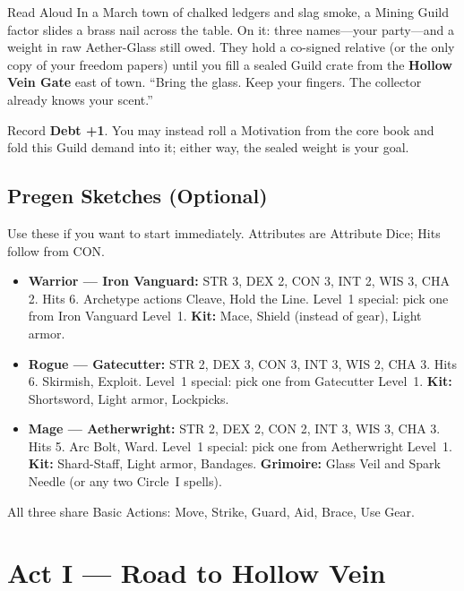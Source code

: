 \begin{rpgbox}{Read Aloud}
    In a March town of chalked ledgers and slag smoke, a Mining Guild factor slides a brass nail across the table.
    On it: three names---your party---and a weight in raw Aether-Glass still owed.
    They hold a co-signed relative (or the only copy of your freedom papers) until you fill a sealed Guild crate from the \textbf{Hollow Vein Gate} east of town.
    ``Bring the glass. Keep your fingers. The collector already knows your scent.''
\end{rpgbox}

Record \textbf{Debt +1}. You may instead roll a Motivation from the core book and fold this Guild demand into it; either way, the sealed weight is your goal.

\subsection{Pregen Sketches (Optional)}

Use these if you want to start immediately. Attributes are Attribute Dice; Hits follow from CON.

\begin{itemize}
    \item \textbf{Warrior --- Iron Vanguard:} STR 3, DEX 2, CON 3, INT 2, WIS 3, CHA 2. Hits 6. Archetype actions Cleave, Hold the Line. Level~1 special: pick one from Iron Vanguard Level~1. \textbf{Kit:} Mace, Shield (instead of gear), Light armor.
    \item \textbf{Rogue --- Gatecutter:} STR 2, DEX 3, CON 3, INT 3, WIS 2, CHA 3. Hits 6. Skirmish, Exploit. Level~1 special: pick one from Gatecutter Level~1. \textbf{Kit:} Shortsword, Light armor, Lockpicks.
    \item \textbf{Mage --- Aetherwright:} STR 2, DEX 2, CON 2, INT 3, WIS 3, CHA 3. Hits 5. Arc Bolt, Ward. Level~1 special: pick one from Aetherwright Level~1. \textbf{Kit:} Shard-Staff, Light armor, Bandages. \textbf{Grimoire:} Glass Veil and Spark Needle (or any two Circle~I spells).
\end{itemize}

All three share Basic Actions: Move, Strike, Guard, Aid, Brace, Use Gear.

\section{Act I --- Road to Hollow Vein}

